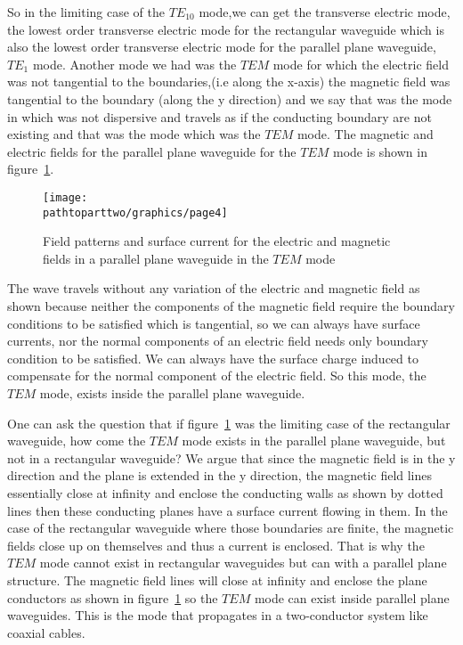 So in the limiting case of the ${TE_{10}}$ mode,we can get the transverse electric mode, the lowest order transverse electric mode for the rectangular waveguide which is also the lowest order transverse electric mode for the parallel plane waveguide, $TE_1$ mode. Another mode we had was the $TEM$ mode for which the electric field was not tangential to the boundaries,(i.e along the x-axis) the magnetic field was tangential to the boundary (along the y direction) and we say that was the mode in which was not dispersive and travels as if the conducting boundary are not existing and that was the mode which was the $TEM$ mode. The magnetic and electric fields for the parallel plane waveguide for the $TEM$ mode is shown in figure~\ref{fig:page4}. 
\begin{figure}[h]
\centering
\texttt{[image: \\pathtoparttwo/graphics/page4]}
\caption{Field patterns and surface current for the electric and magnetic fields in a parallel plane waveguide in the $TEM$ mode}
\label{fig:page4}
\end{figure}

The wave travels without any variation of the electric and magnetic field as shown because neither the components of the magnetic field require the boundary conditions to be satisfied which is tangential, so we can always have surface currents, nor the normal components of an electric field needs only boundary condition to be satisfied. We can always have the surface charge induced to compensate for the normal component of the electric field. So this mode, the $TEM$ mode, exists inside the parallel plane waveguide.

One can ask the question that if figure~\ref{fig:page4} was the limiting case of the rectangular waveguide, how come the $TEM$ mode exists in the parallel plane waveguide, but not in a rectangular waveguide? We argue that since the magnetic field is in the y direction and the plane is extended in the y direction, the magnetic field lines essentially close at infinity and enclose the conducting walls as shown by dotted lines then these conducting planes have a surface current flowing in them. In the case of the rectangular waveguide where those boundaries are finite, the magnetic fields close up on themselves and thus a current is enclosed. That is why the $TEM$ mode cannot exist in rectangular waveguides but can with a parallel plane structure. The magnetic field lines will close at infinity and enclose the plane conductors as shown in figure~\ref{fig:page4} so the $TEM$ mode can exist inside parallel plane waveguides. This is the mode that propagates in a two-conductor system like coaxial cables.


